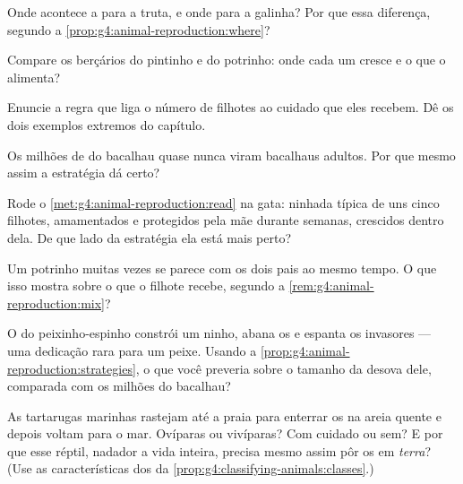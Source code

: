 \begin{exercise}[$\star$]\label{exo:g4:animal-reproduction:4}
Onde acontece a  para a truta, e onde para a galinha? Por
que essa diferença, segundo a
\cref{prop:g4:animal-reproduction:where}?
\end{exercise}

\begin{exercise}[$\star$]\label{exo:g4:animal-reproduction:5}
Compare os berçários do pintinho e do potrinho: onde cada um cresce
e o que o alimenta?
\end{exercise}

\begin{exercise}[$\star$]\label{exo:g4:animal-reproduction:6}
Enuncie a regra que liga o número de filhotes ao cuidado que eles
recebem. Dê os dois exemplos extremos do capítulo.
\end{exercise}

\begin{exercise}[$\star$]\label{exo:g4:animal-reproduction:7}
Os milhões de  do bacalhau quase nunca viram bacalhaus adultos.
Por que mesmo assim a estratégia dá certo?
\end{exercise}

\begin{exercise}[$\star$]\label{exo:g4:animal-reproduction:8}
Rode o \cref{met:g4:animal-reproduction:read} na gata: ninhada
típica de uns cinco filhotes, amamentados e protegidos pela mãe
durante semanas, crescidos dentro dela. De que lado da estratégia
ela está mais perto?
\end{exercise}

\begin{exercise}[$\star\star$]\label{exo:g4:animal-reproduction:9}
Um potrinho muitas vezes se parece com os dois pais ao mesmo tempo.
O que isso mostra sobre o que o filhote recebe, segundo a
\cref{rem:g4:animal-reproduction:mix}?
\end{exercise}

\begin{exercise}[$\star\star$]\label{exo:g4:animal-reproduction:10}
O  do peixinho-espinho constrói um ninho, abana os  e
espanta os invasores --- uma dedicação rara para um peixe. Usando a
\cref{prop:g4:animal-reproduction:strategies}, o que você preveria
sobre o tamanho da desova dele, comparada com os milhões do
bacalhau?
\end{exercise}

\begin{exercise}[$\star\star\star$]\label{exo:g4:animal-reproduction:11}
As tartarugas marinhas rastejam até a praia para enterrar os  na
areia quente e depois voltam para o mar. Ovíparas ou vivíparas? Com
cuidado ou sem? E por que esse réptil, nadador a vida inteira,
precisa mesmo assim pôr os  em \emph{terra}? (Use as
características dos  da
\cref{prop:g4:classifying-animals:classes}.)
\end{exercise}
